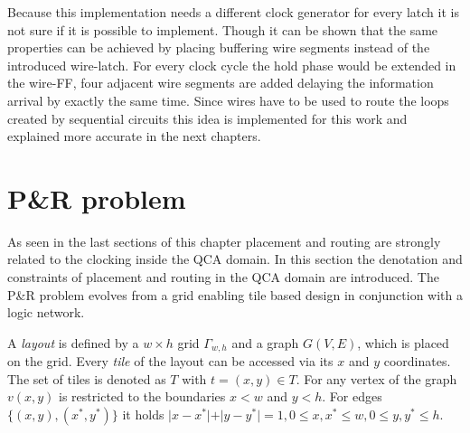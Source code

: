 Because this implementation needs a different clock generator for every latch it is not sure if it is possible to implement. Though it can be shown that the same properties can be achieved by placing buffering wire segments instead of the introduced wire-latch. For every clock cycle the hold phase would be extended in the wire-FF, four adjacent wire segments are added delaying the information arrival by exactly the same time. Since wires have to be used to route the loops created by sequential circuits this idea is implemented for this work and explained more accurate in the next chapters.


\section{P\&R problem} \label{sec:PR}

As seen in the last sections of this chapter placement and routing are strongly related to the clocking inside the QCA domain. In this section the denotation and constraints of placement and routing in the QCA domain are introduced. The P\&R problem evolves from a grid enabling tile based design in conjunction with a logic network.

\begin{definition}
	A \textit{layout} is defined by a $w \times h$ grid $\Gamma_{w, h}$ and a graph $G(V, E)$, which is placed on the grid. Every \textit{tile} of the layout can be accessed via its $x$ and $y$ coordinates. The set of tiles is denoted as $T$ with $t = (x, y) \in T$. For any vertex of the graph $v(x, y)$ is restricted to the boundaries $x < w$ and $y < h$. For edges $\{(x, y), (x^*, y^*)\}$ it holds $\vert x-x^*\vert+\vert y-y^*\vert = 1, 0 \leq x, x^* \leq w, 0 \leq y, y^* \leq h$.
\end{definition}

